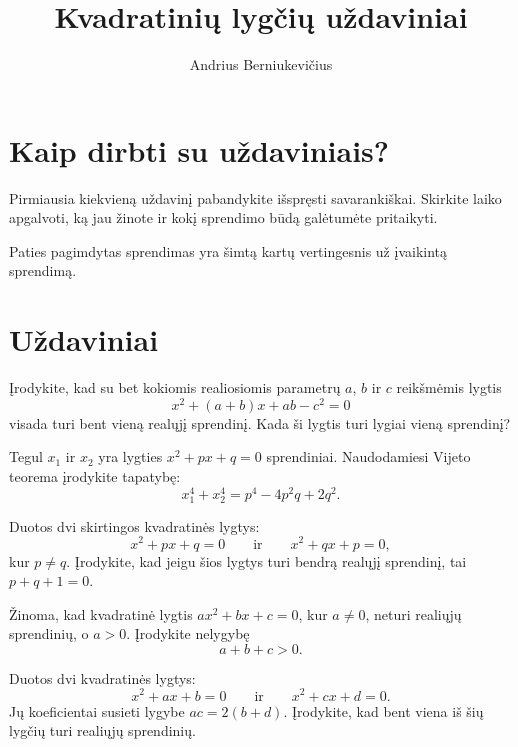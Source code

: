 \documentclass[11pt,a4paper]{scrartcl}
\title{Kvadratinių lygčių uždaviniai}
\author{Andrius Berniukevičius}
\begin{document}
\maketitle
\section*{Kaip dirbti su uždaviniais?}

Pirmiausia kiekvieną uždavinį pabandykite išspręsti savarankiškai. Skirkite laiko apgalvoti, ką jau žinote ir kokį sprendimo būdą galėtumėte pritaikyti.

Paties pagimdytas sprendimas yra šimtą kartų vertingesnis už įvaikintą sprendimą.

\section{Uždaviniai}

\begin{problem}
    Įrodykite, kad su bet kokiomis realiosiomis parametrų $a$, $b$ ir $c$ reikšmėmis lygtis
    \[
    x^2+(a+b)x+ab-c^2=0
    \]
    visada turi bent vieną realųjį sprendinį. Kada ši lygtis turi lygiai vieną sprendinį?
\end{problem}

\begin{problem}
    Tegul $x_1$ ir $x_2$ yra lygties $x^2+px+q=0$ sprendiniai. Naudodamiesi Vijeto teorema įrodykite tapatybę:
    \[
    x_1^4+x_2^4=p^4-4p^2q+2q^2.
    \]
\end{problem}

\begin{problem}
    Duotos dvi skirtingos kvadratinės lygtys:
    \[
    x^2+px+q=0
    \qquad\text{ir}\qquad
    x^2+qx+p=0,
    \]
    kur $p\ne q$. Įrodykite, kad jeigu šios lygtys turi bendrą realųjį sprendinį, tai $p+q+1=0$.
\end{problem}

\begin{problem}
    Žinoma, kad kvadratinė lygtis $ax^2+bx+c=0$, kur $a\ne0$, neturi realiųjų sprendinių, o $a>0$. Įrodykite nelygybę
    \[
    a+b+c>0.
\]
\end{problem}

\begin{problem}
    Duotos dvi kvadratinės lygtys:
    \[
    x^2+ax+b=0
    \qquad\text{ir}\qquad
    x^2+cx+d=0.
    \]
    Jų koeficientai susieti lygybe $ac=2(b+d)$. Įrodykite, kad bent viena iš šių lygčių turi realiųjų sprendinių.
\end{problem}
\end{document}
